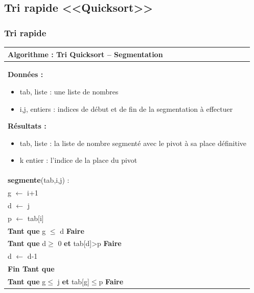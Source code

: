 \documentclass[10pt]{article}
\begin{document}
\subsection{Tri rapide <<Quicksort>>}
\subsubsection{Tri rapide}

\begin{pseudo}
\begin{center}
\begin{tabular}{p{}}
\hline
\textbf{Algorithme :} Tri Quicksort -- Segmentation\\
\hline
\textbf{Données :}
\begin{itemize}
\item \textsf{tab}, liste : une liste de nombres
\item \textsf{i,j}, entiers : indices de début et de fin de la segmentation à effectuer
\end{itemize}
\textbf{Résultats :} 
\begin{itemize}
\item \textsf{tab}, liste : la liste de nombre segmenté avec le pivot à sa place définitive
\item \textsf{k} entier : l'indice de la place du pivot
\end{itemize}
\\
\textbf{segmente}(\textsf{tab,i,j}) :\\
\hspace{.4cm} \textsf{g $\leftarrow$ i+1 }\\
\hspace{.4cm} \textsf{d $\leftarrow$ j}\\
\hspace{.4cm} \textsf{p $\leftarrow$ tab[i]}\\
\hspace{.4cm} \textbf{Tant que} \textsf{g $\leq$ d} \textbf{Faire} \\
\hspace{.8cm} \textbf{Tant que} \textsf{d$\geq$ 0} \textbf{et} \textsf{tab[d]>p} \textbf{Faire} \\
\hspace{1.2cm} \textsf{d $\leftarrow$ d-1}\\  
\hspace{.8cm} \textbf{Fin Tant que}  \\
\hspace{.8cm} \textbf{Tant que} \textsf{g$\leq$ j} \textbf{et} \textsf{tab[g]$\leq$p} \textbf{Faire} \\

\end{tabular}
\end{center}
\end{pseudo}
\end{document}
